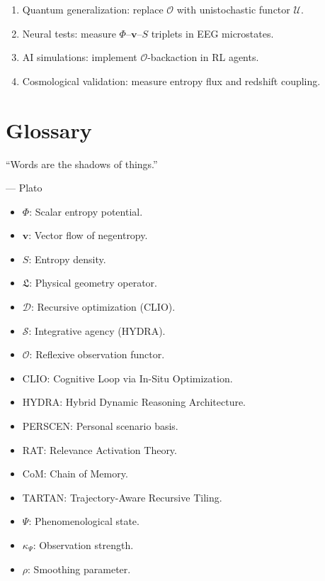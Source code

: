 \documentclass[12pt]{book}
\theoremstyle{definition}
\begin{document}
\begin{enumerate}
\item Quantum generalization: replace $\mathcal{O}$ with unistochastic functor $\mathcal{U}$.
\item Neural tests: measure $\Phi$–$\mathbf{v}$–$S$ triplets in EEG microstates.
\item AI simulations: implement $\mathcal{O}$-backaction in RL agents.
\item Cosmological validation: measure entropy flux and redshift coupling.
\end{enumerate}

\chapter*{Glossary}
\epigraph{``Words are the shadows of things.''}{--- Plato}

\begin{itemize}
\item $\Phi$: Scalar entropy potential.
\item $\mathbf{v}$: Vector flow of negentropy.
\item $S$: Entropy density.
\item $\mathfrak{L}$: Physical geometry operator.
\item $\mathcal{D}$: Recursive optimization (CLIO).
\item $\mathcal{S}$: Integrative agency (HYDRA).
\item $\mathcal{O}$: Reflexive observation functor.
\item \textsf{CLIO}: Cognitive Loop via In-Situ Optimization.
\item \textsf{HYDRA}: Hybrid Dynamic Reasoning Architecture.
\item \textsf{PERSCEN}: Personal scenario basis.
\item \textsf{RAT}: Relevance Activation Theory.
\item \textsf{CoM}: Chain of Memory.
\item \textsf{TARTAN}: Trajectory-Aware Recursive Tiling.
\item $\Psi$: Phenomenological state.
\item $\kappa_\Psi$: Observation strength.
\item $\rho$: Smoothing parameter.
\end{itemize}
\end{document}
